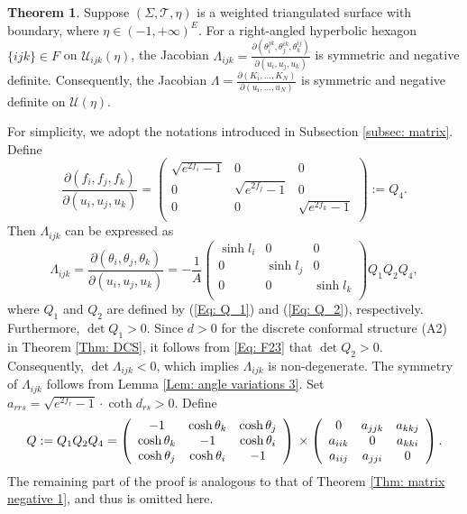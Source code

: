 \documentclass[12pt]{amsart}
\theoremstyle{definition}
\newtheorem{theorem}{Theorem}[section]
\begin{document}
\begin{theorem}\label{Thm: matrix 1}
Suppose $(\Sigma,\mathcal{T},\eta)$ is a weighted triangulated surface with boundary, where $\eta\in (-1,+\infty)^E$.
For a right-angled hyperbolic hexagon $\{ijk\}\in F$ on $\mathcal{U}_{ijk}(\eta)$,
the Jacobian $\Lambda_{ijk}=\frac{\partial(\theta^{jk}_i,\theta^{ik}_j,\theta^{ij}_k)}
{\partial(u_i,u_j,u_k)}$ is symmetric and negative definite.
Consequently, the Jacobian $\Lambda=\frac{\partial (K_i,..., K_N)}{\partial(u_i,...,u_N)}$ is symmetric and negative definite on $\mathcal{U}(\eta)$.
\end{theorem}
\proof
For simplicity, we adopt the notations introduced in Subsection \ref{subsec: matrix}.
Define
\begin{equation*}
\frac{\partial(f_i,f_j,f_k)}
{\partial(u_i,u_j,u_k)}
=\left(
   \begin{array}{ccc}
     \sqrt{e^{2f_i}-1} & 0 & 0 \\
     0 & \sqrt{e^{2f_j}-1} & 0 \\
     0 & 0 & \sqrt{e^{2f_k}-1} \\
   \end{array}
 \right)
 :=Q_4.
\end{equation*}
Then $\Lambda_{ijk}$ can be expressed as
\begin{equation*}
\Lambda_{ijk}=
\frac{\partial(\theta_i,\theta_j,\theta_k)}
{\partial(u_i,u_j,u_k)}
=-\frac{1}{A}
 \left(
   \begin{array}{ccc}
     \sinh l_i & 0 & 0 \\
     0 & \sinh l_j & 0 \\
     0 & 0 & \sinh l_k \\
   \end{array}
 \right)Q_1Q_2Q_4,
\end{equation*}
where $Q_1$ and $Q_2$ are defined by (\ref{Eq: Q_1}) and (\ref{Eq: Q_2}), respectively. 
Furthermore, $\det Q_1>0$.
Since $d>0$ for the discrete conformal structure (A2) in Theorem \ref{Thm: DCS},
it follows from \eqref{Eq: F23} that $\det Q_2>0$.
Consequently, $\det\Lambda_{ijk}<0$,
which implies $\Lambda_{ijk}$ is non-degenerate.
The symmetry of $\Lambda_{ijk}$ follows from Lemma \ref{Lem: angle variations 3}.
Set $a_{rrs}=\sqrt{e^{2f_r}-1}\cdot\coth d_{rs}>0$.
Define
\begin{equation*}
Q:=Q_1Q_2Q_4=\left(
   \begin{array}{ccc}
     -1 & \cosh\theta_k & \cosh\theta_j \\
     \cosh\theta_k & -1 & \cosh\theta_i \\
     \cosh\theta_j & \cosh\theta_i & -1 \\
   \end{array}
 \right)\\
 \times
  \left(
   \begin{array}{ccc}
     0 & a_{jjk} & a_{kkj} \\
     a_{iik} & 0 & a_{kki} \\
     a_{iij} & a_{jji} & 0 \\
   \end{array}
   \right).
\end{equation*}
The remaining part of the proof is analogous to that of Theorem \ref{Thm: matrix negative 1}, and thus is omitted here.
\end{document}
